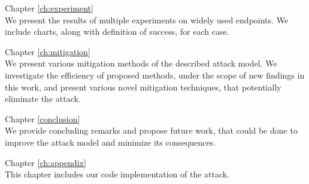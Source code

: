 \begin{description}
\item{Chapter \ref{ch:experiment}} \hfill \\

We present the results of multiple experiments on widely used endpoints. We
include charts, along with definition of success, for each case. \hfill \\

\item{Chapter \ref{ch:mitigation}} \hfill \\

We present various mitigation methods of the described attack model. We
investigate the efficiency of proposed methods, under the scope of new findings
in this work, and present various novel mitigation techniques, that potentially
eliminate the attack.\hfill \\

\item{Chapter \ref{conclusion}} \hfill \\

We provide concluding remarks and propose future work, that could be done to
improve the attack model and minimize its consequences. \hfill \\

\item{Chapter \ref{ch:appendix}} \hfill \\

This chapter includes our code implementation of the attack.  \end{description}

